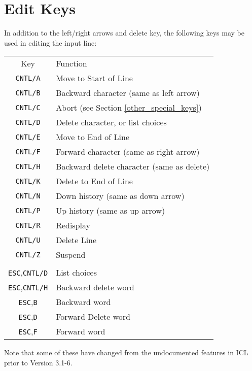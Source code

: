 \documentclass[twoside,11pt,nolof]{starlink}
\begin{document}
\newpage
\section{\label{edit_keys}Edit Keys}
In addition to the left/right arrows and delete key, the following keys may be
used in editing the input line:

\begin{tabular}{cl}
Key & Function\\
\texttt{CNTL/A} & Move to Start of Line\\
\texttt{CNTL/B} & Backward character (same as left arrow)\\
\texttt{CNTL/C} & Abort (see Section \ref{other_special_keys})\\
\texttt{CNTL/D} & Delete character, or list choices\\
\texttt{CNTL/E} & Move to End of Line\\
\texttt{CNTL/F} & Forward character (same as right arrow)\\
\texttt{CNTL/H} & Backward delete character (same as delete)\\
\texttt{CNTL/K} & Delete to End of Line\\
\texttt{CNTL/N} & Down history (same as down arrow)\\
\texttt{CNTL/P} & Up history (same as up arrow)\\
\texttt{CNTL/R} & Redisplay\\
\texttt{CNTL/U} & Delete Line\\
\texttt{CNTL/Z} & Suspend\\
\\
\texttt{ESC},\texttt{CNTL/D} & List choices\\
\texttt{ESC},\texttt{CNTL/H} & Backward delete word\\
\texttt{ESC},\texttt{B} & Backward word\\
\texttt{ESC},\texttt{D} & Forward Delete word\\
\texttt{ESC},\texttt{F} & Forward word\\
\end{tabular}

Note that some of these have changed from the undocumented features in ICL
prior to Version 3.1-6.
\end{document}
